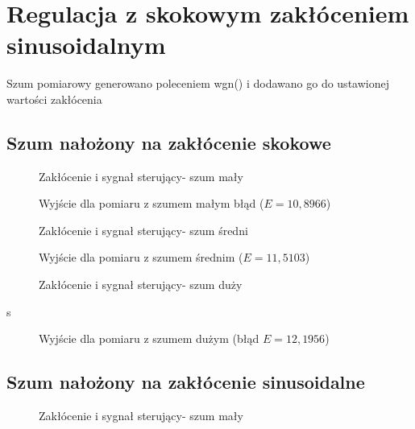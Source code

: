\chapter{Regulacja z skokowym zakłóceniem sinusoidalnym}

Szum pomiarowy generowano poleceniem wgn() i dodawano go do ustawionej wartości zakłócenia

\section{Szum nałożony na zakłócenie skokowe}

\begin{figure}[H]
\centering

\caption{Zakłócenie i sygnał sterujący- szum mały}
\end{figure}

\begin{figure}[H]
\centering

\caption{Wyjście dla pomiaru z szumem małym błąd ($E=10,8966$)}
\end{figure}

\begin{figure}[H]
\centering

\caption{Zakłócenie i sygnał sterujący- szum średni}
\end{figure}

\begin{figure}[H]
\centering

\caption{Wyjście dla pomiaru z szumem średnim ($E=11,5103$)}
\end{figure}

\begin{figure}[H]
\centering

\caption{Zakłócenie i sygnał sterujący- szum duży}
\end{figure}s

\begin{figure}[H]
\centering

\caption{Wyjście dla pomiaru z szumem dużym (błąd $E=12,1956$)}
\end{figure}


\section{Szum nałożony na zakłócenie sinusoidalne}

\begin{figure}[H]
\centering

\caption{Zakłócenie i sygnał sterujący- szum mały}
\end{figure}

